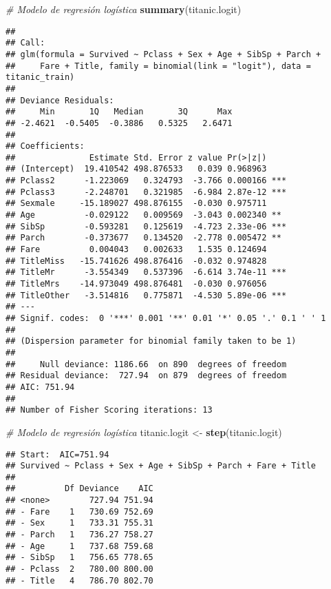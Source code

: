 \documentclass[]{article}
\newenvironment{Shaded}{\begin{snugshade}}{\end{snugshade}}
\newcommand{\KeywordTok}[1]{\textcolor[rgb]{0.13,0.29,0.53}{\textbf{#1}}}
\newcommand{\StringTok}[1]{\textcolor[rgb]{0.31,0.60,0.02}{#1}}
\newcommand{\CommentTok}[1]{\textcolor[rgb]{0.56,0.35,0.01}{\textit{#1}}}
\newcommand{\NormalTok}[1]{#1}
\begin{document}
\begin{Shaded}
\begin{Highlighting}[]
\CommentTok{# Modelo de regresión logística}
\KeywordTok{summary}\NormalTok{(titanic.logit)}
\end{Highlighting}
\end{Shaded}

\begin{verbatim}
## 
## Call:
## glm(formula = Survived ~ Pclass + Sex + Age + SibSp + Parch + 
##     Fare + Title, family = binomial(link = "logit"), data = titanic_train)
## 
## Deviance Residuals: 
##     Min       1Q   Median       3Q      Max  
## -2.4621  -0.5405  -0.3886   0.5325   2.6471  
## 
## Coefficients:
##               Estimate Std. Error z value Pr(>|z|)    
## (Intercept)  19.410542 498.876533   0.039 0.968963    
## Pclass2      -1.223069   0.324793  -3.766 0.000166 ***
## Pclass3      -2.248701   0.321985  -6.984 2.87e-12 ***
## Sexmale     -15.189027 498.876155  -0.030 0.975711    
## Age          -0.029122   0.009569  -3.043 0.002340 ** 
## SibSp        -0.593281   0.125619  -4.723 2.33e-06 ***
## Parch        -0.373677   0.134520  -2.778 0.005472 ** 
## Fare          0.004043   0.002633   1.535 0.124694    
## TitleMiss   -15.741626 498.876416  -0.032 0.974828    
## TitleMr      -3.554349   0.537396  -6.614 3.74e-11 ***
## TitleMrs    -14.973049 498.876481  -0.030 0.976056    
## TitleOther   -3.514816   0.775871  -4.530 5.89e-06 ***
## ---
## Signif. codes:  0 '***' 0.001 '**' 0.01 '*' 0.05 '.' 0.1 ' ' 1
## 
## (Dispersion parameter for binomial family taken to be 1)
## 
##     Null deviance: 1186.66  on 890  degrees of freedom
## Residual deviance:  727.94  on 879  degrees of freedom
## AIC: 751.94
## 
## Number of Fisher Scoring iterations: 13
\end{verbatim}

\begin{Shaded}
\begin{Highlighting}[]
\CommentTok{# Modelo de regresión logística}
\NormalTok{titanic.logit <-}\StringTok{ }\KeywordTok{step}\NormalTok{(titanic.logit)}
\end{Highlighting}
\end{Shaded}

\begin{verbatim}
## Start:  AIC=751.94
## Survived ~ Pclass + Sex + Age + SibSp + Parch + Fare + Title
## 
##          Df Deviance    AIC
## <none>        727.94 751.94
## - Fare    1   730.69 752.69
## - Sex     1   733.31 755.31
## - Parch   1   736.27 758.27
## - Age     1   737.68 759.68
## - SibSp   1   756.65 778.65
## - Pclass  2   780.00 800.00
## - Title   4   786.70 802.70
\end{verbatim}
\end{document}
